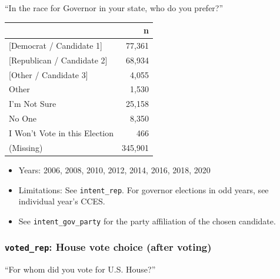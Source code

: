 \documentclass[10pt,article,oneside]{memoir}
\theoremstyle{definition}
\begin{document}
``In the race for Governor in your state, who do you prefer?''

\begin{table}[H]
\centering
\begin{tabular}[t]{lr}
\toprule
 & n\\
\midrule
{}{[Democrat / Candidate 1]} & 77,361\\
{}{[Republican / Candidate 2]} & 68,934\\
{}{[Other / Candidate 3]} & 4,055\\
Other & 1,530\\
I'm Not Sure & 25,158\\
No One & 8,350\\
I Won't Vote in this Election & 466\\
(Missing) & 345,901\\
\bottomrule
\end{tabular}
\end{table}

\begin{itemize}
\tightlist
\item
  Years: 2006, 2008, 2010, 2012, 2014, 2016, 2018, 2020
\item
  Limitations: See \texttt{intent\_rep}. For governor elections in odd
  years, see individual year's CCES.
\item
  See \texttt{intent\_gov\_party} for the party affiliation of the
  chosen candidate.
\end{itemize}

\hypertarget{voted_rep-house-vote-choice-after-voting}{%
\subsubsection{\texorpdfstring{\texttt{voted\_rep}: House vote choice
(after
voting)}{voted\_rep: House vote choice (after voting)}}\label{voted_rep-house-vote-choice-after-voting}}

``For whom did you vote for U.S. House?''
\end{document}
